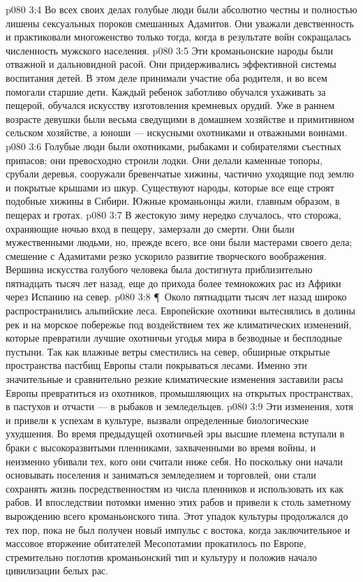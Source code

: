 \vs p080 3:4 Во всех своих делах голубые люди были абсолютно честны и полностью лишены сексуальных пороков смешанных Адамитов. Они уважали девственность и практиковали многоженство только тогда, когда в результате войн сокращалась численность мужского населения.
\vs p080 3:5 Эти кроманьонские народы были отважной и дальновидной расой. Они придерживались эффективной системы воспитания детей. В этом деле принимали участие оба родителя, и во всем помогали старшие дети. Каждый ребенок заботливо обучался ухаживать за пещерой, обучался искусству изготовления кремневых орудий. Уже в раннем возрасте девушки были весьма сведущими в домашнем хозяйстве и примитивном сельском хозяйстве, а юноши --- искусными охотниками и отважными воинами.
\vs p080 3:6 Голубые люди были охотниками, рыбаками и собирателями съестных припасов; они превосходно строили лодки. Они делали каменные топоры, срубали деревья, сооружали бревенчатые хижины, частично уходящие под землю и покрытые крышами из шкур. Существуют народы, которые все еще строят подобные хижины в Сибири. Южные кроманьонцы жили, главным образом, в пещерах и гротах.
\vs p080 3:7 В жестокую зиму нередко случалось, что сторожа, охраняющие ночью вход в пещеру, замерзали до смерти. Они были мужественными людьми, но, прежде всего, все они были мастерами своего дела; смешение с Адамитами резко ускорило развитие творческого воображения. Вершина искусства голубого человека была достигнута приблизительно пятнадцать тысяч лет назад, еще до прихода более темнокожих рас из Африки через Испанию на север.
\vs p080 3:8 \P\ Около пятнадцати тысяч лет назад широко распространились альпийские леса. Европейские охотники вытеснялись в долины рек и на морское побережье под воздействием тех же климатических изменений, которые превратили лучшие охотничьи угодья мира в безводные и бесплодные пустыни. Так как влажные ветры сместились на север, обширные открытые пространства пастбищ Европы стали покрываться лесами. Именно эти значительные и сравнительно резкие климатические изменения заставили расы Европы превратиться из охотников, промышляющих на открытых пространствах, в пастухов и отчасти --- в рыбаков и земледельцев.
\vs p080 3:9 Эти изменения, хотя и привели к успехам в культуре, вызвали определенные биологические ухудшения. Во время предыдущей охотничьей эры высшие племена вступали в браки с высокоразвитыми пленниками, захваченными во время войны, и неизменно убивали тех, кого они считали ниже себя. Но поскольку они начали основывать поселения и заниматься земледелием и торговлей, они стали сохранять жизнь посредственностям из числа пленников и использовать их как рабов. И впоследствии потомки именно этих рабов и привели к столь заметному вырождению всего кроманьонского типа. Этот упадок культуры продолжался до тех пор, пока не был получен новый импульс с востока, когда заключительное и массовое вторжение обитателей Месопотамии прокатилось по Европе, стремительно поглотив кроманьонский тип и культуру и положив начало цивилизации белых рас.
